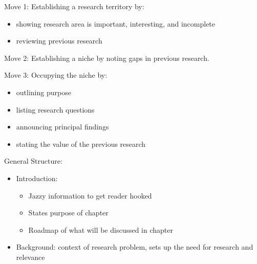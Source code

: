 \begin{writingdirectives}

      \item Move 1: Establishing a research territory by:
      \begin{itemize}

            \item showing research area is important, interesting, and
                  incomplete

            \item reviewing previous research

      \end{itemize}

      \item Move 2: Establishing a niche by noting gaps in previous research.

      \item Move 3: Occupying the niche by:
      \begin{itemize}

            \item outlining purpose

            \item listing research questions

            \item announcing principal findings

            \item stating the value of the previous research

      \end{itemize}

      \item General Structure:
      \begin{itemize}

            \item Introduction:
                  \begin{itemize}

                        \item Jazzy information to get reader hooked

                        \item States purpose of chapter

                        \item Roadmap of what will be discussed in chapter

                  \end{itemize}

            \item Background: context of research problem, sets up the need for
                  research and relevance


\end{itemize}
\end{writingdirectives}
